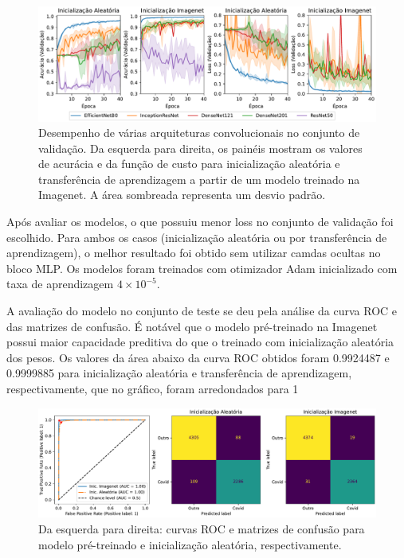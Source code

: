 \documentclass[a4,12pt]{horizon-theme}
\begin{document}
\begin{figure}[!ht]
  \centering
  \includegraphics[width=\textwidth]{figures/model_arch.pdf}
  \caption{Desempenho de várias arquiteturas convolucionais no conjunto de validação. Da esquerda para direita, os painéis mostram os valores de acurácia e da função de custo para inicialização aleatória e transferência de aprendizagem a partir de um modelo treinado na Imagenet. A área sombreada representa um desvio padrão.}
  \label{fig:model_arch}
\end{figure}

\newpage
Após avaliar os modelos, o que possuiu menor loss no conjunto de validação foi escolhido. Para ambos os casos (inicialização aleatória ou por transferência de aprendizagem), o melhor resultado foi obtido sem utilizar camdas ocultas no bloco MLP. Os modelos foram treinados com otimizador Adam inicializado com taxa de aprendizagem $4\times 10^{-5}$.

A avaliação do modelo no conjunto de teste se deu pela análise da curva ROC e das matrizes de confusão. É notável que o modelo pré-treinado na Imagenet possui maior capacidade preditiva do que o treinado com inicialização aleatória dos pesos. Os valores da área abaixo da curva ROC obtidos foram 0.9924487 e 0.9999885 para inicialização aleatória e transferência de aprendizagem, respectivamente, que no gráfico, foram arredondados para 1

\begin{figure}[!ht]
  \centering
  \includegraphics[width=\textwidth]{figures/best_models_cm.pdf}
  \caption{Da esquerda para direita: curvas ROC e matrizes de confusão para modelo pré-treinado e inicialização aleatória, respectivamente.}
  \label{fig:x}
\end{figure}
\end{document}
